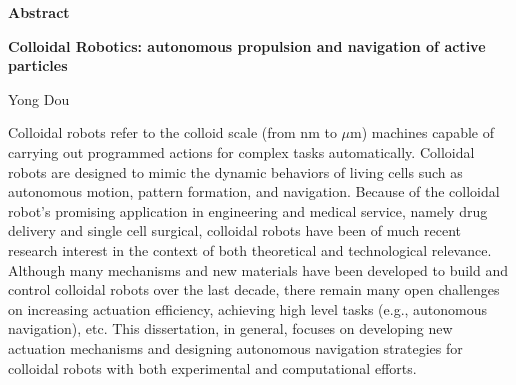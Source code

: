 

\begin{titlepage}
\begin{center}

\vspace*{1\baselineskip}
\textbf{\huge Abstract}

\textbf{Colloidal Robotics: autonomous propulsion and navigation of active particles}

Yong Dou
\end{center}

\hspace{5mm}Colloidal robots refer to the colloid scale (from nm to $\mu$m) machines capable of carrying out programmed actions for complex tasks automatically.   Colloidal robots are designed to mimic the dynamic behaviors of living cells such as autonomous motion, pattern formation, and navigation. Because of the colloidal robot's promising application in engineering and medical service, namely drug delivery and single cell surgical, colloidal robots have been of much recent research interest in the context of both theoretical and technological relevance. Although many mechanisms and new materials have been developed to build and control colloidal robots over the last decade, there remain many open challenges on increasing actuation efficiency, achieving high level tasks (e.g., autonomous navigation), etc. This dissertation, in general, focuses on developing new actuation mechanisms and designing  autonomous navigation strategies for colloidal robots with both experimental and computational efforts.


\end{titlepage}
